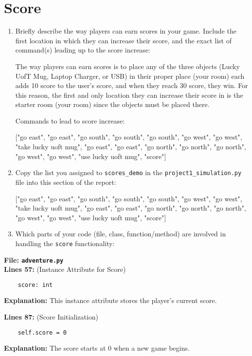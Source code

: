 \documentclass[11pt]{article}
\begin{document}
\section*{Score}
\begin{enumerate}

    \item Briefly describe the way players can earn scores in your game. Include the first location in which they can
    increase their score, and the exact list of command(s) leading up to the score increase:

The way players can earn scores is to place any of the three objects (Lucky UofT Mug, Laptop Charger, or USB) in their
proper place (your room) each adds 10 score to the user's score, and when they reach 30 score, they win. For this
reason, the first and only location they can increase their score in is the starter room (your room) since the objects
must be placed there.

Commands to lead to score increase:

["go east", "go east", "go south", "go south", "go south", "go west", "go west", "take lucky uoft mug", "go east",
"go east", "go north", "go north", "go north", "go west", "go west", "use lucky uoft mug", "score"]

    \item Copy the list you assigned to \texttt{scores\_demo} in the \texttt{project1\_simulation.py} file into this
    section of the report:

["go east", "go east", "go south", "go south", "go south", "go west", "go west", "take lucky uoft mug", "go east",
"go east", "go north", "go north", "go north", "go west", "go west", "use lucky uoft mug", "score"]

    \item Which parts of your code (file, class, function/method) are involved in handling the \texttt{score}
    functionality:
\end{enumerate}

\textbf{File: \texttt{adventure.py}}\\

\noindent\textbf{Lines 57:} (Instance Attribute for Score)
\begin{verbatim}
    score: int
\end{verbatim}
\textbf{Explanation:} This instance attribute stores the player's current score.

\noindent\textbf{Lines 87:} (Score Initialization)
\begin{verbatim}
    self.score = 0
\end{verbatim}
\textbf{Explanation:} The score starts at 0 when a new game begins.
\end{document}
